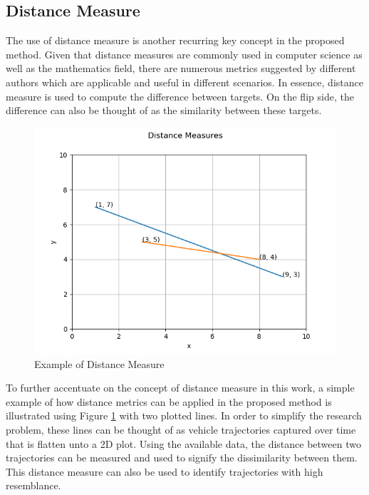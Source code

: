 \subsection{Distance Measure}
\label{section:distancemeasures}

The use of distance measure is another recurring key concept in the proposed method. Given that distance measures are commonly used in computer science as well as the mathematics field, there are numerous metrics suggested by different authors which are applicable and useful in different scenarios. In essence, distance measure is used to compute the difference between targets. On the flip side, the difference can also be thought of as the similarity between these targets.

\begin{figure}[hbt!]\centering
\includegraphics[width=.7\textwidth]{image/general/distance.png}
\caption{Example of Distance Measure}
\label{fig:distanceMeasure}
\end{figure}

To further accentuate on the concept of distance measure in this work, a simple example of how distance metrics can be applied in the proposed method is illustrated using Figure \ref{fig:distanceMeasure} with two plotted lines. In order to simplify the research problem, these lines can be thought of as vehicle trajectories captured over time that is flatten unto a 2D plot. Using the available data, the distance between two trajectories can be measured and used to signify the dissimilarity between them. This distance measure can also be used to identify trajectories with high resemblance. 

